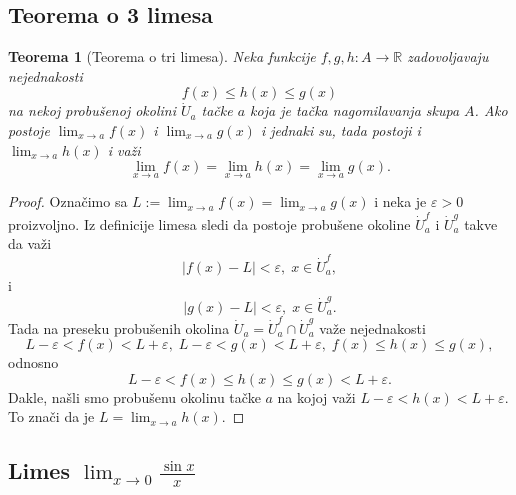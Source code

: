 \documentclass[a4paper,12pt]{article}
\theoremstyle{plain}
\newtheorem{theorem}{Teorema}[section]
\theoremstyle{definition}
\theoremstyle{remark}
\begin{document}
\subsection{Teorema o 3 limesa}
\begin{theorem}[Teorema o tri limesa]
    Neka funkcije $f, g, h : A \to \mathbb{R}$ zadovoljavaju nejednakosti
    \[ f(x) \le h(x) \le g(x) \]
    na nekoj probušenoj okolini $\dot{U}_a$ tačke $a$ koja je tačka nagomilavanja skupa $A$. Ako postoje $\displaystyle \lim_{x \to a} f(x)$ i $\displaystyle \lim_{x \to a} g(x)$ i jednaki su, tada postoji i $\displaystyle \lim_{x \to a} h(x)$ i važi
    \[ \lim_{x \to a} f(x) = \lim_{x \to a} h(x) = \lim_{x \to a} g(x). \]
\end{theorem}

\begin{proof}
    Označimo sa $\displaystyle L := \lim_{x \to a} f(x) = \lim_{x \to a} g(x)$ i neka je $\varepsilon > 0$ proizvoljno. Iz definicije limesa sledi da postoje probušene okoline $\dot{U}_a^f$ i $\dot{U}_a^g$ takve da važi
    \[ |f(x) - L| < \varepsilon, \; x \in \dot{U}_a^f, \]
    i
    \[ |g(x) - L| < \varepsilon, \; x \in \dot{U}_a^g. \]
    Tada na preseku probušenih okolina $\dot{U}_a = \dot{U}_a^f \cap \dot{U}_a^g$ važe nejednakosti
    \[ L - \varepsilon < f(x) < L + \varepsilon, \; L - \varepsilon < g(x) < L + \varepsilon, \; f(x) \le h(x) \le g(x), \]
    odnosno
    \[ L - \varepsilon < f(x) \le h(x) \le g(x) < L + \varepsilon. \]
    Dakle, našli smo probušenu okolinu tačke $a$ na kojoj važi $L - \varepsilon < h(x) < L + \varepsilon$. To znači da je $\displaystyle L = \lim_{x \to a} h(x)$.
\end{proof}
\subsection{Limes \texorpdfstring{$\displaystyle\lim_{x\to0} \frac{\sin x}{x}$}{lim sin x / x}}
\end{document}

